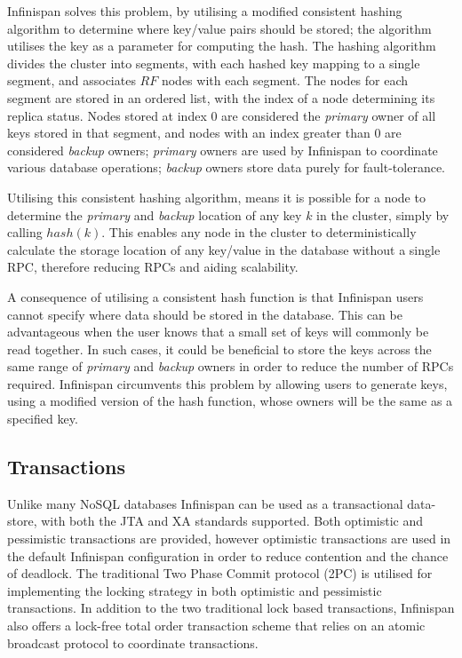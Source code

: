    Infinispan solves this problem, by utilising a modified consistent hashing algorithm\citep{Karger:1997:CHR:258533.258660, Infinispan, Ruivo:2011:ETO:2120967.2121604} to determine where key/value pairs should be stored; the algorithm utilises the key as a parameter for computing the hash.  The hashing algorithm divides the cluster into segments, with each hashed key mapping to a single segment, and associates $RF$ nodes with each segment. The nodes for each segment are stored in an ordered list, with the index of a node determining its replica status.  Nodes stored at index 0 are considered the \emph{primary} owner of all keys stored in that segment, and nodes with an index greater than 0 are considered \emph{backup} owners; \emph{primary} owners are used by Infinispan to coordinate various database operations; \emph{backup} owners store data purely for fault-tolerance.  
 
    Utilising this consistent hashing algorithm, means it is possible for a node to determine the \emph{primary} and \emph{backup} location of any key $k$ in the cluster, simply by calling $hash(k)$. This enables any node in the cluster to deterministically calculate the storage location of any key/value in the database without a single RPC, therefore reducing RPCs and aiding scalability.  
    
    A consequence of utilising a consistent hash function is that Infinispan users cannot specify where data should be stored in the database. This can be advantageous when the user knows that a small set of keys will commonly be read together.  In such cases, it could be beneficial to store the keys across the same range of \emph{primary} and \emph{backup} owners in order to reduce the number of RPCs required.  Infinispan circumvents this problem by allowing users to generate keys, using a modified version of the hash function, whose owners will be the same as a specified key.  
    
    \subsection{Transactions}
    Unlike many NoSQL databases Infinispan can be used as a transactional data-store, with both the JTA\citep{JTA} and XA\citep{XA} standards supported.  Both optimistic\citep{Kung:1981:OMC:319566.319567} and pessimistic transactions\citep{Bernstein:1981:CCD:356842.356846} are provided, however optimistic transactions are used in the default Infinispan configuration in order to reduce contention and the chance of deadlock.  The traditional Two Phase Commit protocol (2PC)\citep{Bernstein:1996:PTP:261193} is utilised for implementing the locking strategy in both optimistic and pessimistic transactions.  In addition to the two traditional lock based transactions, Infinispan also offers a lock-free total order transaction scheme that relies on an atomic broadcast protocol to coordinate transactions.  
	    
